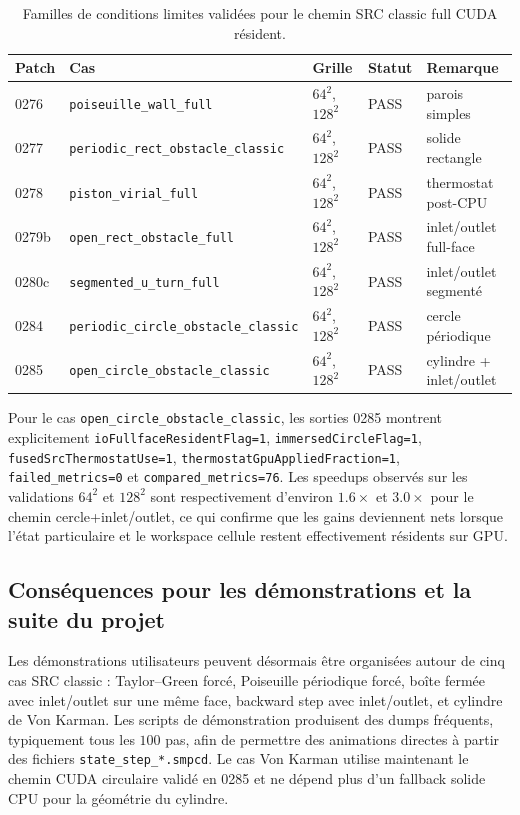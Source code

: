 \documentclass[11pt,a4paper]{article}
\begin{document}
\begin{table}[h]
\centering
\begin{tabular}{lllll}
\hline
Patch & Cas & Grille & Statut & Remarque \\
\hline
0276 & \texttt{poiseuille\_wall\_full} & $64^2$, $128^2$ & PASS & parois simples \\
0277 & \texttt{periodic\_rect\_obstacle\_classic} & $64^2$, $128^2$ & PASS & solide rectangle \\
0278 & \texttt{piston\_virial\_full} & $64^2$, $128^2$ & PASS & thermostat post-CPU \\
0279b & \texttt{open\_rect\_obstacle\_full} & $64^2$, $128^2$ & PASS & inlet/outlet full-face \\
0280c & \texttt{segmented\_u\_turn\_full} & $64^2$, $128^2$ & PASS & inlet/outlet segmenté \\
0284 & \texttt{periodic\_circle\_obstacle\_classic} & $64^2$, $128^2$ & PASS & cercle périodique \\
0285 & \texttt{open\_circle\_obstacle\_classic} & $64^2$, $128^2$ & PASS & cylindre + inlet/outlet \\
\hline
\end{tabular}
\caption{Familles de conditions limites validées pour le chemin SRC classic full CUDA résident.}
\label{tab:cuda-src-classic-0286}
\end{table}

Pour le cas \texttt{open\_circle\_obstacle\_classic}, les sorties 0285 montrent explicitement \texttt{ioFullfaceResidentFlag=1}, \texttt{immersedCircleFlag=1}, \texttt{fusedSrcThermostatUse=1}, \texttt{thermostatGpuAppliedFraction=1}, \texttt{failed\_metrics=0} et \texttt{compared\_metrics=76}. Les speedups observés sur les validations $64^2$ et $128^2$ sont respectivement d'environ $1.6\times$ et $3.0\times$ pour le chemin cercle+inlet/outlet, ce qui confirme que les gains deviennent nets lorsque l'état particulaire et le workspace cellule restent effectivement résidents sur GPU.

\subsection{Conséquences pour les démonstrations et la suite du projet}

Les démonstrations utilisateurs peuvent désormais être organisées autour de cinq cas SRC classic : Taylor--Green forcé, Poiseuille périodique forcé, boîte fermée avec inlet/outlet sur une même face, backward step avec inlet/outlet, et cylindre de Von Karman. Les scripts de démonstration produisent des dumps fréquents, typiquement tous les $100$ pas, afin de permettre des animations directes à partir des fichiers \texttt{state\_step\_*.smpcd}. Le cas Von Karman utilise maintenant le chemin CUDA circulaire validé en 0285 et ne dépend plus d'un fallback solide CPU pour la géométrie du cylindre.
\end{document}
